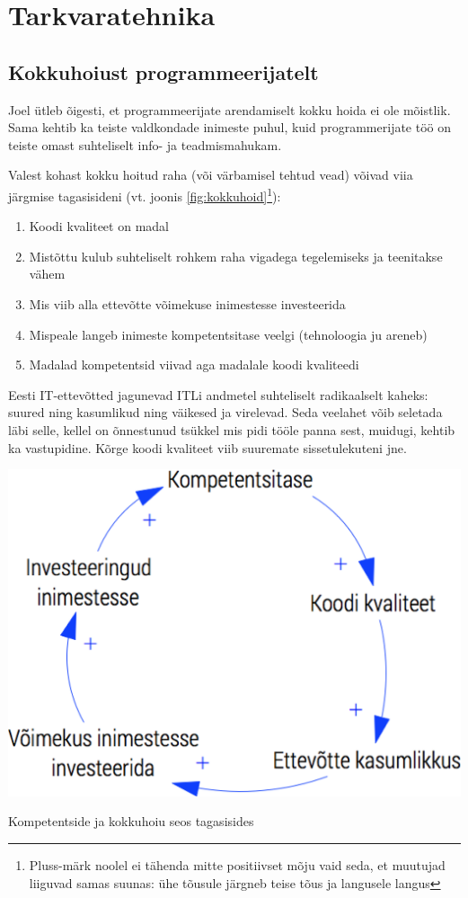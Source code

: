 \chapter{Tarkvaratehnika}
\section{Kokkuhoiust programmeerijatelt}
\label{sec:kokkuhoid}
Joel ütleb õigesti, et programmeerijate arendamiselt kokku hoida ei ole mõistlik. Sama kehtib ka teiste valdkondade inimeste puhul, kuid programmerijate töö on teiste omast suhteliselt info- ja teadmismahukam.

Valest kohast kokku hoitud raha (või värbamisel tehtud vead) võivad viia järgmise tagasisideni (vt. joonis \ref{fig:kokkuhoid}\footnote{Pluss-märk noolel ei tähenda mitte positiivset mõju vaid seda, et muutujad liiguvad samas suunas: ühe tõusule järgneb teise tõus ja langusele langus}):
\begin{enumerate}
	\item Koodi kvaliteet on madal
	\item Mistõttu kulub suhteliselt rohkem raha vigadega tegelemiseks ja teenitakse vähem
	\item Mis viib alla ettevõtte võimekuse inimestesse investeerida
	\item Mispeale langeb inimeste kompetentsitase veelgi (tehnoloogia ju areneb)
	\item Madalad kompetentsid viivad aga madalale koodi kvaliteedi
\end{enumerate}

Eesti IT-ettevõtted jagunevad ITLi andmetel suhteliselt radikaalselt kaheks: suured ning kasumlikud ning väikesed ja virelevad. Seda veelahet võib seletada läbi selle, kellel on õnnestunud tsükkel mis pidi tööle panna sest, muidugi, kehtib ka vastupidine. Kõrge koodi kvaliteet viib suuremate sissetulekuteni jne.

\begin{marginfigure}
		\includegraphics[width=\linewidth]{kvaliteet.png}
		\caption{Kompetentside ja kokkuhoiu seos tagasisides}
		\label{fig:kokkuhoid}
\end{marginfigure}

